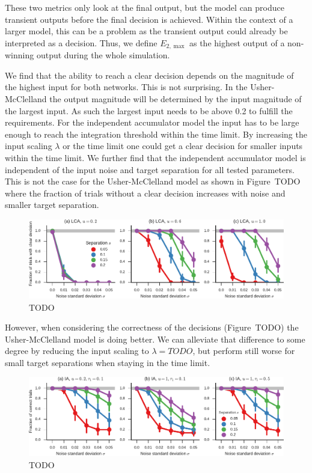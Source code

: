 \documentclass[10pt,letterpaper]{article}
\begin{document}
These two metrics only look at the final output, but the model can produce 
transient outputs before the final decision is achieved. Within the context of 
a larger model, this can be a problem as the transient output could already be 
interpreted as a decision. Thus, we define $E_{2,\max}$ as the highest output of 
a non-winning output during the whole simulation.


We find that the ability to reach a clear decision depends on the magnitude of 
the highest input for both networks. This is not surprising. In the 
Usher-McClelland the output magnitude will be determined by the input magnitude 
of the largest input. As such the largest input needs to be above 0.2 to fulfill 
the requirements. For the independent accumulator model the input has to be 
large enough to reach the integration threshold within the time limit. By 
increasing the input scaling $\lambda$ or the time limit one could get a clear 
decision for smaller inputs within the time limit. We further find that the 
independent accumulator model is independent of the input noise and target 
separation for all tested parameters. This is not the case for the 
Usher-McClelland model as shown in Figure~TODO where the fraction of trials 
without a clear decision increases with noise and smaller target separation.
\begin{figure}
    \centering
    \includegraphics{figures/decisions}
    \caption{TODO}\label{fig:decisions}
\end{figure}

However, when considering the correctness of the decisions (Figure~TODO) the 
Usher-McClelland model is doing better. We can alleviate that difference to some 
degree by reducing the input scaling to $\lambda = TODO$, but perform still 
worse for small target separations when staying in the time limit.
\begin{figure}
    \centering
    \includegraphics{figures/correct}
    \caption{TODO}\label{fig:correct}
\end{figure}
\end{document}
